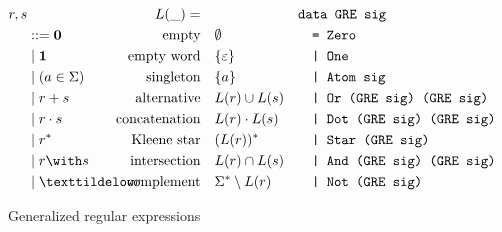 \begin{figure}[tp]
  \begin{align*}
    r, s & &L(\_)=\quad &  &
                             \makebox[1em][l]{\texttt{data GRE sig}}\\
         & ::= \Rnull & \ltext{empty}
                        & \emptyset
                           &&\texttt{= Zero}\\
         & \mid \Rempty & \ltext{empty word}
                        & \{ \varepsilon \}
                           && \texttt{| One}\\
         & \mid (a \in \Sigma) & \ltext{singleton}
                        &  \{ a \}
                           && \texttt{| Atom sig} \\
         & \mid \Runion rs & \ltext{alternative}
                        &  L (r) \cup L (s)
                           && \texttt{| Or (GRE sig) (GRE sig)}\\
         & \mid \Rconcat rs & \ltext{concatenation}
                        &  L (r) \cdot L (s)
                           && \texttt{| Dot (GRE sig) (GRE sig)}\\
         & \mid \Rstar r & \ltext{Kleene star}
                        & (L (r))^* 
                           && \texttt{| Star (GRE sig)}\\
         & \mid \Rintersect rs & \ltext{intersection}
                        & L (r) \cap L (s)
                           && \texttt{| And (GRE sig) (GRE sig)}\\
         & \mid \Rcomplement r & \ltext{complement}
                        & \Sigma^* \setminus L (r)
                           && \texttt{| Not (GRE sig)}
  \end{align*}
  \caption{Generalized regular expressions}
  \label{fig:generalized-regular-expressions}
\end{figure}

